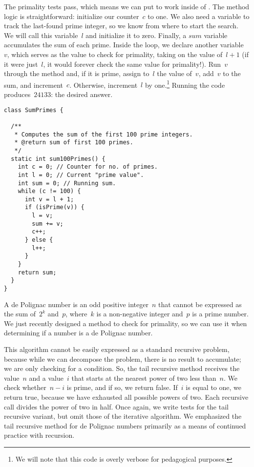 The primality tests pass, which means we can put  to work inside of . 
The method logic is straightforward: initialize our counter~$c$ to one. 
We also need a variable to track the last-found prime integer, so we know from where to start the search. 
We will call this variable~$l$ and initialize it to zero. 
Finally, a $\mathit{sum}$ variable accumulates the sum of each prime. 
Inside the loop, we declare another variable~$v$, which serves as the value to check for primality, taking on the value of~$l + 1$ (if it were just~$l$, it would forever check the same value for primality!). 
Run~$v$ through the  method and, if it is prime, assign to~$l$ the value of~$v$, add~$v$ to the sum, and increment~$c$. 
Otherwise, increment~$l$ by one.\footnote{We will note that this code is overly verbose for pedagogical purposes.}
Running the code produces~$24133$: the desired answer.

\enlargethispage{2\baselineskip}
\begin{lstlisting}[language=MyJava]
class SumPrimes {

  /**
   * Computes the sum of the first 100 prime integers.
   * @return sum of first 100 primes.
   */
  static int sum100Primes() {
    int c = 0; // Counter for no. of primes.
    int l = 0; // Current "prime value".
    int sum = 0; // Running sum.
    while (c != 100) {
      int v = l + 1;
      if (isPrime(v)) {
        l = v;
        sum += v;
        c++;
      } else {
        l++;
      }
    }
    return sum;
  }
}
\end{lstlisting}


A de Polignac number is an odd positive integer~$n$ that cannot be expressed as the sum of~$2^k$ and~$p$, where~$k$ is a non-negative integer and~$p$ is a prime number.
We just recently designed a method to check for primality, so we can use it when determining if a number is a de Polignac number.

This algorithm cannot be easily expressed as a standard recursive problem, because while we can decompose the problem, there is no result to accumulate; we are only checking for a condition.
So, the tail recursive method receives the value~$n$ and a value~$i$ that starts at the nearest power of two less than~$n$.
We check whether~$n - i$ is prime, and if so, we return false.
If~$i$ is equal to one, we return true, because we have exhausted all possible powers of two.
Each recursive call divides the power of two in half.
Once again, we write tests for the tail recursive variant, but omit those of the iterative algorithm.
We emphasized the tail recursive method for de Polignac numbers primarily as a means of continued practice with recursion.

